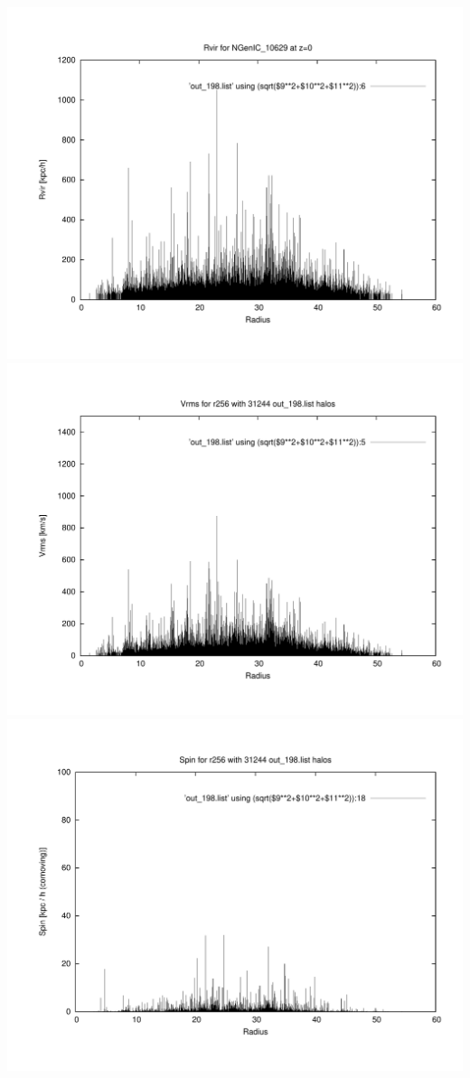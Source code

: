 \includegraphics[scale=0.3]{NGenIC_10629/plot_rvir_z0.pdf}
\includegraphics[scale=0.3]{NGenIC_10629/plot_Vrms_out_198.pdf}
\includegraphics[scale=0.3]{NGenIC_10629/plot_spin_out_198.pdf}

